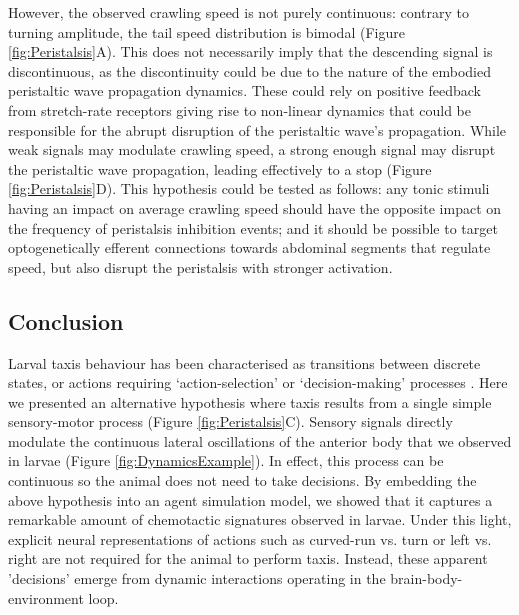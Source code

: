 \documentclass[11pt,a4paper]{article}
\newcommand{\todoBW}[1]{\todo[author=BW,color=orange, size=\tiny,inline]{1}}
\begin{document}
However, the observed crawling speed is not purely continuous: contrary to turning amplitude, the tail speed distribution is bimodal (Figure \ref{fig:Peristalsis}A).
 This does not necessarily imply that the descending signal is discontinuous, as the discontinuity could be due to the nature of the embodied peristaltic wave propagation dynamics. These could rely on positive feedback from stretch-rate receptors \citep{ross2015model} giving rise to non-linear dynamics that could be responsible for the abrupt disruption of the peristaltic wave's propagation. While weak signals may modulate crawling speed, a strong enough signal may disrupt the peristaltic wave propagation, leading effectively to a stop (Figure \ref{fig:Peristalsis}D).
  This hypothesis could be tested as follows: any tonic stimuli having an impact on average crawling speed should have the opposite impact on the frequency of peristalsis inhibition events; and it should be possible to target optogenetically efferent connections towards abdominal segments that regulate speed, but also disrupt the peristalsis with stronger activation.

\subsection{Conclusion}
Larval taxis behaviour has been characterised as transitions between discrete states, or actions \citep{green1983organization, cobbwhatandhow1999, gomez2012active}  requiring ‘action-selection’ or ‘decision-making’ processes \citep{gomez2014multilevel}. Here we presented an alternative hypothesis where taxis results from a single simple sensory-motor process (Figure \ref{fig:Peristalsis}C). Sensory signals directly modulate the continuous lateral oscillations of the anterior body that we observed in larvae (Figure \ref{fig:DynamicsExample}). In effect, this process can be continuous so the animal does not need to take decisions. By embedding the above hypothesis into an agent simulation model, we showed that it captures a remarkable amount of chemotactic signatures observed in larvae.  Under this light, explicit neural representations of actions such as curved-run vs. turn or left vs. right are not required for the animal to perform taxis. Instead, these apparent 'decisions' emerge from dynamic interactions operating in the brain-body-environment loop.
\end{document}
